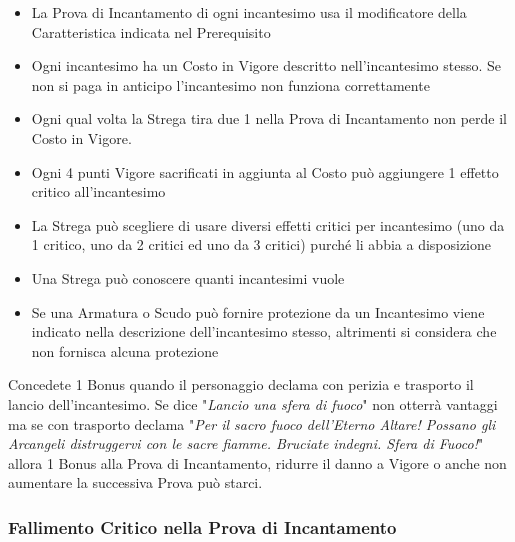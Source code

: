 \documentclass[12pt,a4paper,twoside,openany]{book}
\begin{document}
\begin{multicols}{2}
\begin{itemize}
\item 
La Prova di Incantamento di ogni incantesimo usa il modificatore della Caratteristica indicata nel Prerequisito

\item 
Ogni incantesimo ha un Costo in Vigore descritto nell'incantesimo stesso. Se non si paga in anticipo l'incantesimo non funziona correttamente\\

\item 
Ogni qual volta la Strega tira due 1 nella Prova di Incantamento non perde il Costo in Vigore.

\item 
Ogni 4 punti Vigore sacrificati in aggiunta al Costo può aggiungere 1 effetto critico all'incantesimo

\item 
La Strega può scegliere di usare diversi effetti critici per incantesimo (uno da 1 critico, uno da 2 critici ed uno da 3 critici) purché li abbia a disposizione

\item 
Una Strega può conoscere quanti incantesimi vuole

\item 
Se una Armatura o Scudo può fornire protezione da un Incantesimo viene indicato nella descrizione dell'incantesimo stesso, altrimenti si considera che non fornisca alcuna protezione

\end{itemize}

\begin{changemargin}{0.3cm}{0.3cm}\begin{narratore}
Concedete 1 Bonus quando il personaggio declama con perizia e trasporto il lancio dell'incantesimo. Se dice "\textit{Lancio una sfera di fuoco}" non otterrà vantaggi ma se con trasporto declama "\textit{Per il sacro fuoco dell'Eterno Altare! Possano gli Arcangeli distruggervi con le sacre fiamme. Bruciate indegni. Sfera di Fuoco!}" allora 1 Bonus alla Prova di Incantamento, ridurre il danno a Vigore o anche non aumentare la successiva Prova può starci.
\end{narratore}\end{changemargin}


\subsubsection{Fallimento Critico nella Prova di Incantamento}\label{magiefallimentocriticonellaprovadimagia}


\end{multicols}
\end{document}
